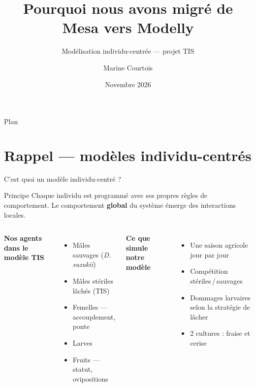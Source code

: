 \documentclass[aspectratio=169, 11pt]{beamer}
\title[Mesa \textrightarrow{} Modelly]{Pourquoi nous avons migré de Mesa vers Modelly}
\subtitle{Modélisation individu-centrée — projet TIS}
\author{Marine Courtois}
\institute{Modelly-TIS-Research}
\date{Novembre 2026}
\begin{document}
\begin{frame}
  \titlepage
\end{frame}

\begin{frame}{Plan}
  \tableofcontents
\end{frame}

\section{Rappel — modèles individu-centrés}

\begin{frame}{C'est quoi un modèle individu-centré ?}

  \begin{block}{Principe}
    Chaque individu est programmé avec ses propres règles de comportement.
    Le comportement \textbf{global} du système émerge des interactions locales.
  \end{block}

  \bigskip

  \begin{columns}[T]
      \textbf{Nos agents dans le modèle TIS}
      \medskip
      \begin{itemize}\setlength\itemsep{4pt}
        \item Mâles sauvages (\textit{D. suzukii})
        \item Mâles stériles lâchés (TIS)
        \item Femelles — accouplement, ponte
        \item Larves
        \item Fruits — statut, ovipositions
      \end{itemize}

      \textbf{Ce que simule notre modèle}
      \medskip
      \begin{itemize}\setlength\itemsep{4pt}
        \item Une saison agricole jour par jour
        \item Compétition stériles\,/\,sauvages
        \item Dommages larvaires selon la stratégie de lâcher
        \item 2 cultures : fraise et cerise
      \end{itemize}
  \end{columns}

\end{frame}
\end{document}

